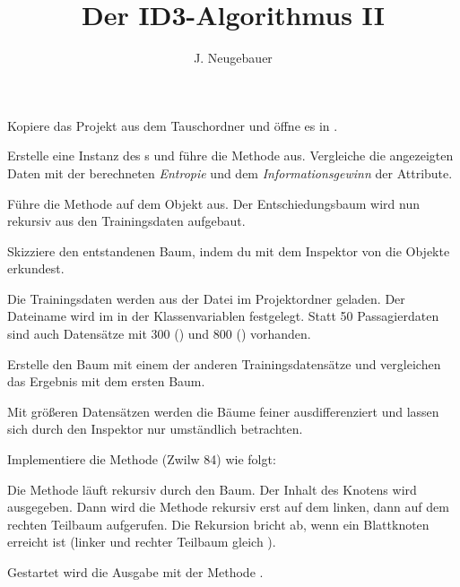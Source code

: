 \documentclass[10pt, a4paper]{scrartcl}
\author{J. Neugebauer}
\title{Der ID3-Algorithmus II}
\date{\Heute}
\begin{document}
\ReiheTitel

Kopiere das Projekt  aus dem Tauschordner
und öffne es in .

\begin{aufgabe}
	Erstelle eine Instanz des s und führe die Methode  aus. Vergleiche die angezeigten Daten mit der berechneten \emph{Entropie} und dem \emph{Informationsgewinn} der Attribute.
\end{aufgabe}

\begin{aufgabe}
	Führe die Methode  auf dem Objekt aus. Der
	Entschiedungsbaum wird nun rekursiv aus den Trainingsdaten aufgebaut.
	
	Skizziere den entstandenen Baum, indem du mit dem Inspektor von 
	 die Objekte erkundest.
	
	\begin{rahmen}
		\vspace*{4cm}
	\end{rahmen}
	\medskip
\end{aufgabe}

\begin{aufgabe}
	Die Trainingsdaten werden aus der Datei  im Projektordner geladen. Der Dateiname wird im  in der Klassenvariablen  festgelegt. Statt 50 Passagierdaten sind auch Datensätze mit 300 () und 800 () vorhanden.
	
	Erstelle den Baum mit einem der anderen Trainingsdatensätze und vergleichen
	das Ergebnis mit dem ersten Baum.
	
\end{aufgabe}

\begin{aufgabe}
	Mit größeren Datensätzen werden die Bäume feiner ausdifferenziert und lassen sich durch den Inspektor nur umständlich betrachten.
	
	Implementiere die Methode  (Zwilw 84) wie folgt:
	
	Die Methode läuft rekursiv durch den Baum. Der Inhalt des Knotens wird ausgegeben. Dann wird die Methode rekursiv erst auf dem linken, dann auf dem rechten Teilbaum aufgerufen. Die Rekursion bricht ab, wenn ein Blattknoten erreicht ist (linker und rechter Teilbaum gleich ).
	
	Gestartet wird die Ausgabe mit der Methode .
\end{aufgabe}
\end{document}
